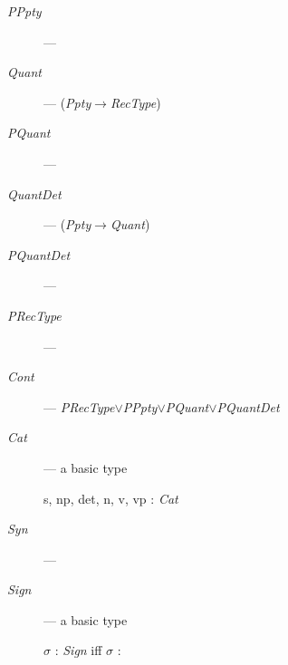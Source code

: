 \begin{description}
      \item[\textnormal{\textit{PPpty}}] --- 
        
      \item[\textnormal{\textit{Quant}}] ---
        (\textit{Ppty}$\rightarrow$\textit{RecType})
        
      \item[\textnormal{\textit{PQuant}}] --- 
        
      \item[\textnormal{\textit{QuantDet}}] ---
        (\textit{Ppty}$\rightarrow$\textit{Quant})
        
      \item[\textnormal{\textit{PQuantDet}}] ---
        
      \item[\textnormal{\textit{PRecType}}] ---
          

    \item[\textnormal{\textit{Cont}}] --- \textit{PRecType}$\vee$\textit{PPpty}$\vee$\textit{PQuant}$\vee$\textit{PQuantDet}

      
    \item[\textnormal{\textit{Cat}}] --- a basic type

      s, np, det, n, v, vp : \textit{Cat}

    
    \item[\textnormal{\textit{Syn}}] ---   
 


  
    \item[\textnormal{\textit{Sign}}] ---  a basic type

      $\sigma$ : \textit{Sign} iff $\sigma$ :


\end{description}
